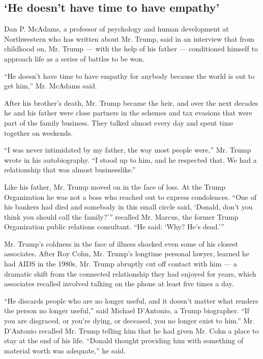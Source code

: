 \hypertarget{he-doesnt-have-time-to-have-empathy}{%
\subsection{`He doesn't have time to have
empathy'}\label{he-doesnt-have-time-to-have-empathy}}

Dan P. McAdams, a professor of psychology and human development at
Northwestern who has written about Mr. Trump, said in an interview that
from childhood on, Mr. Trump --- with the help of his father ---
conditioned himself to approach life as a series of battles to be won.

``He doesn't have time to have empathy for anybody because the world is
out to get him,'' Mr. McAdams said.

After his brother's death, Mr. Trump became the heir, and over the next
decades he and his father were close partners in the schemes and tax
evasions that were part of the family business. They talked almost every
day and spent time together on weekends.

``I was never intimidated by my father, the way most people were,'' Mr.
Trump wrote in his autobiography. ``I stood up to him, and he respected
that. We had a relationship that was almost businesslike.''

Like his father, Mr. Trump moved on in the face of loss. At the Trump
Organization he was not a boss who reached out to express condolences.
``One of his bankers had died and somebody in this small circle said,
`Donald, don't you think you should call the family?''' recalled Mr.
Marcus, the former Trump Organization public relations consultant. ``He
said: `Why? He's dead.'''

Mr. Trump's coldness in the face of illness shocked even some of his
closest associates. After Roy Cohn, Mr. Trump's longtime personal
lawyer, learned he had AIDS in the 1980s, Mr. Trump abruptly cut off
contact with him --- a dramatic shift from the connected relationship
they had enjoyed for years, which associates recalled involved talking
on the phone at least five times a day.

``He discards people who are no longer useful, and it doesn't matter
what renders the person no longer useful,'' said Michael D'Antonio, a
Trump biographer. ``If you are disgraced, or you're dying, or deceased,
you no longer exist to him.'' Mr. D'Antonio recalled Mr. Trump telling
him that he had given Mr. Cohn a place to stay at the end of his life.
``Donald thought providing him with something of material worth was
adequate,'' he said.

